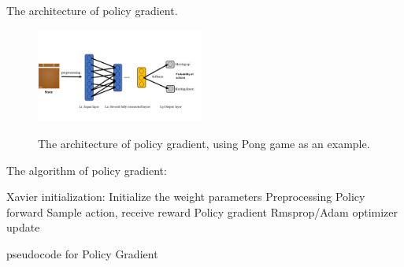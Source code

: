 The architecture of policy gradient. 

\begin{figure}[h!]
\centering
\includegraphics[width=0.49\textwidth]{./fig/policygradient.pdf} \\
\caption{The architecture of policy gradient, using Pong game as an example.}
\label{fig:pg_picture}
\end{figure}


The algorithm of policy gradient:

\begin{algorithm}[H]
\begin{algorithmic}[1]
\STATE Xavier initialization: Initialize the weight parameters
\STATE Preprocessing 
\STATE Policy forward
\STATE Sample action, receive reward
\STATE Policy gradient
\STATE Rmsprop/Adam optimizer update
\ENDIF
\ENDWHILE
\end{algorithmic}
\caption{pseudocode for Policy Gradient }
\label{alg:pseudocode Pong}
\end{algorithm}


